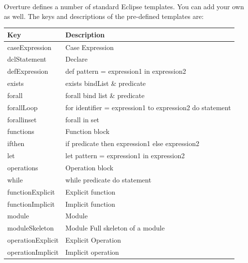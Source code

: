 \documentclass{overturerepchap}
\begin{document}
Overture defines a number of standard Eclipse templates. You can add
your own as well. The keys and descriptions of the pre-defined templates
are:

\begin{longtable}{| l| p{9cm}| }\hline
Key & Description\\\hline
caseExpression            & Case Expression\\
dclStatement              & Declare\\
defExpression             & def pattern = expression1 in expression2\\
exists                    & exists bindList \& predicate\\
forall                    & forall bind list \& predicate\\
forallLoop                & for identifier = expression1 to expression2 do statement\\
forallinset               & forall in set\\
functions                 & Function block\\
ifthen                    & if predicate then expression1 else expression2\\
let                       & let pattern = expression1 in expression2\\
operations                & Operation block\\
while                     & while predicate do statement\\

functionExplicit          & Explicit function\\
functionImplicit          & Implicit function\\
module                    & Module\\
moduleSkeleton            & Module Full skeleton of a module\\
operationExplicit         & Explicit Operation\\
operationImplicit         & Implicit operation\\


\end{longtable}
\end{document}
